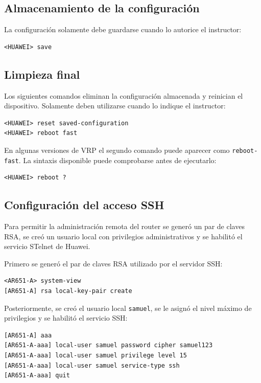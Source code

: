\subsection{Almacenamiento de la configuración}

La configuración solamente debe guardarse cuando lo autorice el instructor:

\begin{lstlisting}[style=terminal]
<HUAWEI> save
\end{lstlisting}

\subsection{Limpieza final}

Los siguientes comandos eliminan la configuración almacenada y reinician el
dispositivo. Solamente deben utilizarse cuando lo indique el instructor:

\begin{lstlisting}[style=terminal]
<HUAWEI> reset saved-configuration
<HUAWEI> reboot fast
\end{lstlisting}

En algunas versiones de VRP el segundo comando puede aparecer como
\texttt{reboot-fast}. La sintaxis disponible puede comprobarse antes de
ejecutarlo:

\begin{lstlisting}[style=terminal]
<HUAWEI> reboot ?
\end{lstlisting}


\subsection{Configuración del acceso SSH}

Para permitir la administración remota del router se generó un par de claves
RSA, se creó un usuario local con privilegios administrativos y se habilitó
el servicio STelnet de Huawei.

Primero se generó el par de claves RSA utilizado por el servidor SSH:

\begin{lstlisting}[style=terminal]
<AR651-A> system-view
[AR651-A] rsa local-key-pair create
\end{lstlisting}

Posteriormente, se creó el usuario local \texttt{samuel}, se le asignó el
nivel máximo de privilegios y se habilitó el servicio SSH:

\begin{lstlisting}[style=terminal]
[AR651-A] aaa
[AR651-A-aaa] local-user samuel password cipher samuel123
[AR651-A-aaa] local-user samuel privilege level 15
[AR651-A-aaa] local-user samuel service-type ssh
[AR651-A-aaa] quit
\end{lstlisting}

